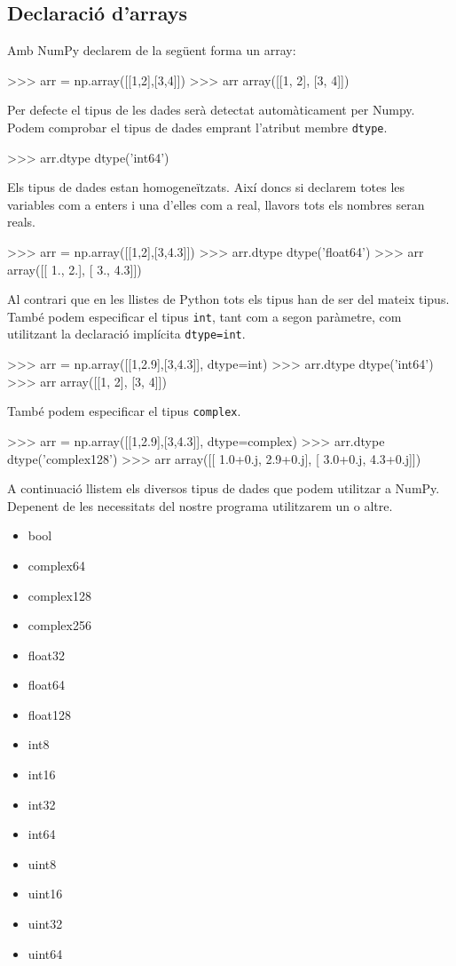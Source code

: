 \subsection{Declaració d'arrays}
Amb NumPy declarem de la següent forma un array:
\begin{tip}[caption=Iicialització d'array amb NumPy]
>>> arr = np.array([[1,2],[3,4]])
>>> arr
array([[1, 2],
       [3, 4]])
\end{tip}
Per defecte el tipus de les dades serà detectat automàticament per Numpy. Podem comprobar el tipus de dades emprant l'atribut membre {\tt dtype}.
\begin{blockcode}
>>> arr.dtype
dtype('int64')
\end{blockcode}
Els tipus de dades estan homogeneïtzats. Així doncs si declarem totes les variables com a enters i una d'elles com a real, llavors tots els nombres seran reals.
\begin{blockcode}
>>> arr = np.array([[1,2],[3,4.3]])
>>> arr.dtype
dtype('float64')
>>> arr
array([[ 1.,  2.],
       [ 3.,  4.3]])
\end{blockcode}
Al contrari que en les llistes de Python tots els tipus han de ser del mateix tipus. També podem especificar el tipus {\tt int}, tant com a segon paràmetre, com utilitzant la declaració implícita {\tt dtype=int}.
\begin{blockcode}
>>> arr = np.array([[1,2.9],[3,4.3]], dtype=int)
>>> arr.dtype
dtype('int64')
>>> arr
array([[1, 2],
       [3, 4]])
\end{blockcode}
També podem especificar el tipus {\tt complex}.
\begin{blockcode}
>>> arr = np.array([[1,2.9],[3,4.3]], dtype=complex)
>>> arr.dtype
dtype('complex128')
>>> arr
array([[ 1.0+0.j,  2.9+0.j],
       [ 3.0+0.j,  4.3+0.j]])
\end{blockcode}
A continuació llistem els diversos tipus de dades que podem utilitzar a NumPy. Depenent de les necessitats del nostre programa utilitzarem un o altre.
\begin{itemize}
\item bool
\item complex64
\item complex128
\item complex256
\item float32
\item float64
\item float128
\item int8
\item int16
\item int32
\item int64
\item uint8
\item uint16
\item uint32
\item uint64
\end{itemize}
